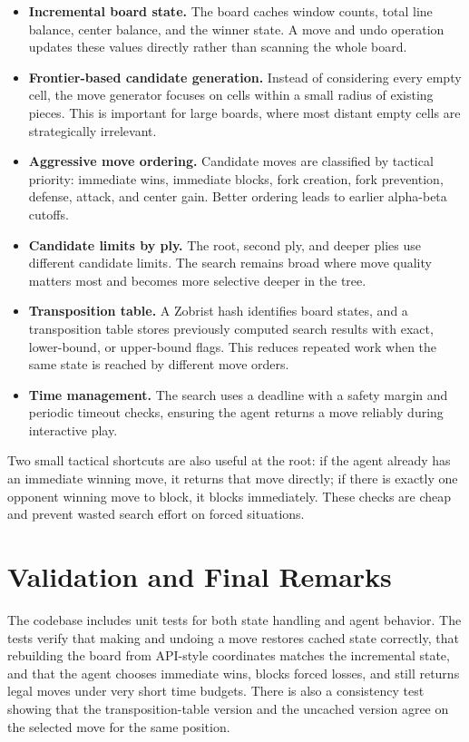 \documentclass[10pt]{article}
\begin{document}
\begin{itemize}
\item \textbf{Incremental board state.} The board caches window counts, total line balance, center balance, and the winner state. A move and undo operation updates these values directly rather than scanning the whole board.
\item \textbf{Frontier-based candidate generation.} Instead of considering every empty cell, the move generator focuses on cells within a small radius of existing pieces. This is important for large boards, where most distant empty cells are strategically irrelevant.
\item \textbf{Aggressive move ordering.} Candidate moves are classified by tactical priority: immediate wins, immediate blocks, fork creation, fork prevention, defense, attack, and center gain. Better ordering leads to earlier alpha-beta cutoffs.
\item \textbf{Candidate limits by ply.} The root, second ply, and deeper plies use different candidate limits. The search remains broad where move quality matters most and becomes more selective deeper in the tree.
\item \textbf{Transposition table.} A Zobrist hash identifies board states, and a transposition table stores previously computed search results with exact, lower-bound, or upper-bound flags. This reduces repeated work when the same state is reached by different move orders.
\item \textbf{Time management.} The search uses a deadline with a safety margin and periodic timeout checks, ensuring the agent returns a move reliably during interactive play.
\end{itemize}

Two small tactical shortcuts are also useful at the root: if the agent already has an immediate winning move, it returns that move directly; if there is exactly one opponent winning move to block, it blocks immediately. These checks are cheap and prevent wasted search effort on forced situations.

\section*{Validation and Final Remarks}
The codebase includes unit tests for both state handling and agent behavior. The tests verify that making and undoing a move restores cached state correctly, that rebuilding the board from API-style coordinates matches the incremental state, and that the agent chooses immediate wins, blocks forced losses, and still returns legal moves under very short time budgets. There is also a consistency test showing that the transposition-table version and the uncached version agree on the selected move for the same position.
\end{document}
